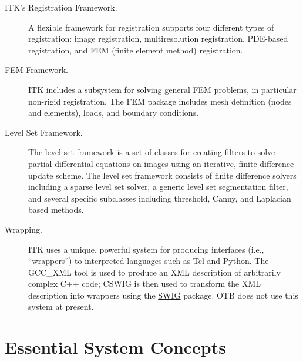 \begin{description}
	\item[ITK's Registration Framework.] A flexible framework for
        registration supports four different types of registration:
        image registration, multiresolution registration, PDE-based
        registration, and FEM (finite element method) registration.

	\item[FEM Framework.] ITK includes a subsystem for solving general
        FEM problems, in particular non-rigid registration. The FEM package
        includes mesh definition (nodes and elements), loads, and boundary
        conditions.

	\item[Level Set Framework.] The level set framework is a set of
        classes for creating filters to solve partial differential equations
        on images using an iterative, finite difference update scheme. The
        level set framework consists of finite difference solvers including a
        sparse level set solver, a generic level set segmentation filter, and
        several specific subclasses including threshold, Canny, and Laplacian
        based methods.

	\item[Wrapping.] ITK uses a unique, powerful system for
	producing interfaces (i.e., ``wrappers'') to interpreted
	languages such as Tcl and Python. The GCC\_XML tool is used to
	produce an XML description of arbitrarily complex C++ code;
	CSWIG is then used to transform the XML description into
	wrappers using the \href{http://www.swig.org/}{SWIG}
	package. OTB does not use this system at present.

        
\end{description}


\section{Essential System Concepts}
\label{sec:EssentialSystemConcepts}

